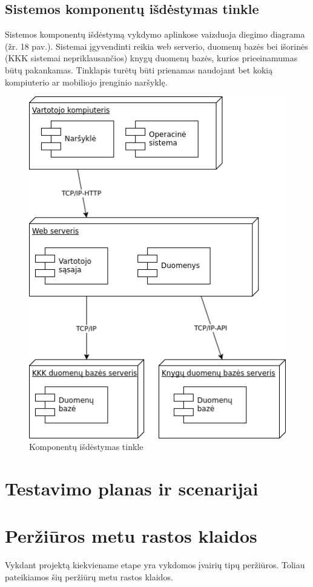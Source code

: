 \documentclass{VUMIFPSkursinis}
\begin{document}
	\subsection{Sistemos komponentų išdėstymas tinkle}
		Sistemos komponentų išdėstymą vykdymo aplinkose vaizduoja diegimo diagrama (žr. 18 pav.).
		Sistemai įgyvendinti reikia web serverio, duomenų bazės bei išorinės (KKK sistemai nepriklausančios) 
		knygų duomenų bazės, kurios prieeinamumas būtų pakankamas.
		Tinklapis turėtų būti prienamas naudojant bet kokią kompiuterio ar mobiliojo įrenginio naršyklę.
		\begin{figure}[H]
			\centering
			\includegraphics[scale=0.9]{img/Deployment.png}
			\caption{Komponentų išdėstymas tinkle}
			\label{img:psi2-deployment}
		\end{figure}

\section{Testavimo planas ir scenarijai}

\section{Peržiūros metu rastos klaidos}
	Vykdant projektą kiekviename etape yra vykdomos įvairių tipų peržiūros.
	Toliau pateikiamos šių peržiūrų metu rastos klaidos.
\end{document}
